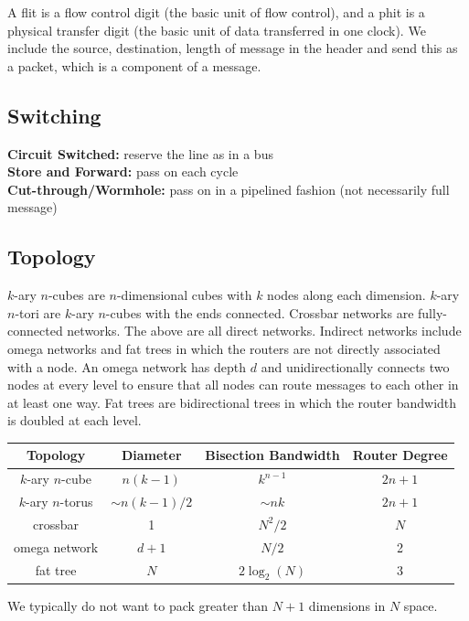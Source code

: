 \documentclass{article}
\begin{document}
A flit is a flow control digit (the basic unit of flow control), and a phit is a physical transfer digit (the basic unit of data transferred in one clock). We include the source, destination, length of message in the header and send this as a packet, which is a component of a message.

\subsection{Switching}
\textbf{Circuit Switched:} reserve the line as in a bus \\
\textbf{Store and Forward:} pass on each cycle\\
\textbf{Cut-through/Wormhole:} pass on in a pipelined fashion (not necessarily full message)

\subsection{Topology}

$k$-ary $n$-cubes are $n$-dimensional cubes with $k$ nodes along each dimension. $k$-ary $n$-tori are $k$-ary $n$-cubes with the ends connected. Crossbar networks are fully-connected networks. The above are all direct networks. Indirect networks include omega networks and fat trees in which the routers are not directly associated with a node. An omega network has depth $d$ and unidirectionally connects two nodes at every level to ensure that all nodes can route messages to each other in at least one way. Fat trees are bidirectional trees in which the router bandwidth is doubled at each level.

\begin{center}
\begin{tabular}{ c || c | c | c }
 \textbf{Topology} & \textbf{Diameter} & \textbf{Bisection Bandwidth} & \textbf{Router Degree} \\ 
 \hline \hline
 $k$-ary $n$-cube & $n(k-1)$ & $k^{n-1}$ & $2n + 1$ \\
 $k$-ary $n$-torus & $\sim n(k-1)/2$ & $\sim nk$ & $2n + 1$ \\
 crossbar & 1 & $N^2/2$ & $N$ \\
 omega network & $d+1$ & $N/2$ & 2 \\
 fat tree & $N$ & $2\log_2(N)$ & 3 \\
\end{tabular}
\end{center}
We typically do not want to pack greater than $N+1$ dimensions in $N$ space.
\end{document}

